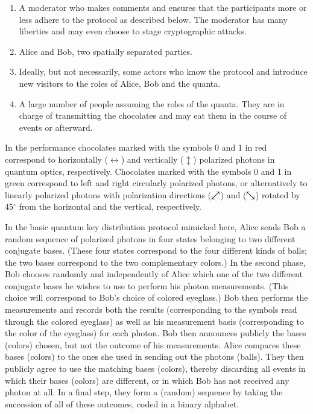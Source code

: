 \documentclass[prb,amssymb,preprint]{revtex4}
\def\ddarrow{{\swarrow\mkern-18mu\nearrow}}
\def\cddarrow{{\searrow\mkern-18mu\nwarrow}}
\begin{document}
\begin{enumerate}

\item A moderator who makes comments and ensures that the participants more
or less adhere to the protocol as described below. The moderator has many
liberties and may even choose to stage cryptographic attacks.

\item Alice and Bob, two spatially separated parties.

\item Ideally, but not necessarily, some actors who know the protocol and
introduce new visitors to the roles of Alice, Bob and the quanta.

\item A large number of people assuming the roles of the quanta. They are in
charge of transmitting the chocolates and may eat them in the course of
events or afterward.

\end{enumerate}

In the performance chocolates marked with the symbols 0 and 1 in red
correspond to horizontally
($\leftrightarrow$) and vertically ($\updownarrow$) polarized photons in
quantum optics, respectively. Chocolates marked with the symbols
0 and 1 in green correspond to left and right circularly polarized
photons, or alternatively to linearly polarized photons with polarization
directions ($\ddarrow$) and ($\cddarrow$) rotated by 45$^\circ$
from the horizontal and the vertical, respectively.

In the basic quantum key distribution protocol mimicked here, Alice sends
Bob a random sequence of polarized photons in four states belonging to two
different conjugate bases. (These four states correspond to the four
different kinds of balls; the two bases correspond to
the two complementary colors.) In the second phase, Bob chooses randomly and
independently of Alice which one of the two different conjugate bases he
wishes to use to perform his photon measurements. (This choice
will correspond to Bob's choice of colored eyeglass.) Bob then performs the
measurements and records both the results (corresponding to the symbols read
through the colored eyeglass) as well as his measurement basis
(corresponding to the color of the eyeglass) for each photon. Bob
then announces publicly the bases (colors) chosen, but not the outcome of
his measurements. Alice compares these bases (colors) to the ones she used
in sending out the photons (balls). They then publicly agree to use the
matching bases (colors), thereby discarding all events in which their bases
(colors) are different, or in which Bob has not received any photon at all.
In a final step, they form a (random) sequence by taking the succession of
all of these outcomes,
coded in a binary alphabet.
\end{document}

